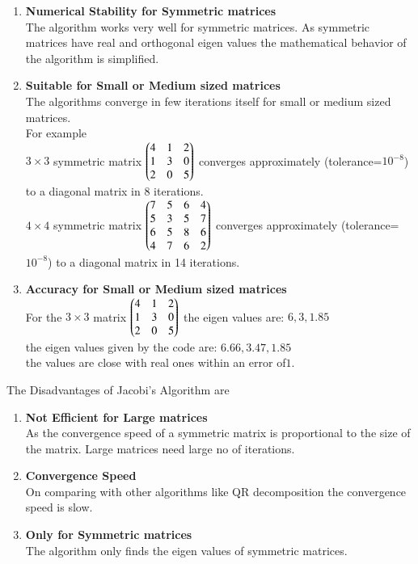 \documentclass[journal,12pt,onecolumn]{IEEEtran}
\theoremstyle{remark}
\begin{document}
\begin{enumerate}
    \item \textbf{Numerical Stability for Symmetric matrices}\\
    The algorithm works very well for symmetric matrices. As symmetric matrices have real and orthogonal eigen values the mathematical 	behavior of the algorithm is simplified.\\
    \item \textbf{Suitable for Small or Medium sized matrices}\\
    The algorithms converge in few iterations itself for small or medium sized matrices.\\
    For example\\
    $3 \times 3$ symmetric  matrix $\begin{pmatrix}4 & 1 & 2 \\1 & 3 & 0\\ 2 & 0 & 5\end{pmatrix}$ converges approximately (tolerance=$10^{-8}$) to a diagonal matrix in 8 iterations.\\
    $4 \times 4$ symmetric matrix $\begin{pmatrix}7 &5& 6& 4 \\5 &3 &5& 7\\ 6& 5& 8 &6\\ 4 &7& 6 &2\end{pmatrix}$ converges approximately (tolerance=$10^{-8}$) to a diagonal matrix in 14 iterations.\\
    \item \textbf{Accuracy for Small or Medium sized matrices}\\
    For the $3\times3$ matrix $\begin{pmatrix}4 & 1 & 2 \\1 & 3 & 0\\ 2 & 0 & 5\end{pmatrix}$ the eigen values are: $6,3,1.85$\\
    the eigen values given by the code are: $6.66,3.47,1.85$\\
    the values are close with real ones within an error of$1$.\\
\end{enumerate}
The Disadvantages of Jacobi's Algorithm are \\
\begin{enumerate}
    \item \textbf{Not Efficient for Large matrices}\\
    As the convergence speed of a symmetric matrix is proportional to the size of the matrix. Large matrices need large no of iterations.\\
    \item \textbf{Convergence Speed}\\
    On comparing with other algorithms like QR decomposition the convergence speed is slow.\\
    \item \textbf{Only for Symmetric matrices}\\
    The algorithm only finds the eigen values of symmetric matrices.\\
\end{enumerate}
\end{document}
